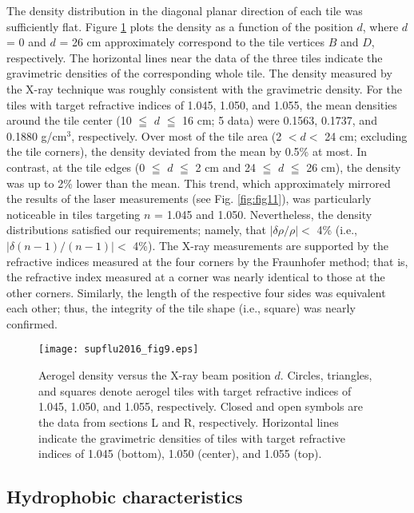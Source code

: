 \documentclass[5p,twocolumn]{elsarticle}
\begin{document}
The density distribution in the diagonal planar direction of each tile was sufficiently flat. Figure \ref{fig:fig9} plots the density as a function of the position $d$, where $d$ = 0 and $d$ = 26 cm approximately correspond to the tile vertices $B$ and $D$, respectively. The horizontal lines near the data of the three tiles indicate the gravimetric densities of the corresponding whole tile. The density measured by the X-ray technique was roughly consistent with the gravimetric density. For the tiles with target refractive indices of 1.045, 1.050, and 1.055, the mean densities around the tile center (10 $\leqq $ $d$ $\leqq $ 16 cm; 5 data) were 0.1563, 0.1737, and 0.1880 g/cm$^3$, respectively. Over most of the tile area (2 $< d <$ 24 cm; excluding the tile corners), the density deviated from the mean by 0.5\% at most. In contrast, at the tile edges (0 $\leqq $ $d$ $\leqq $ 2 cm and 24 $\leqq $ $d$ $\leqq $ 26 cm), the density was up to 2\% lower than the mean. This trend, which approximately mirrored the results of the laser measurements (see Fig. \ref{fig:fig11}), was particularly noticeable in tiles targeting $n$ = 1.045 and 1.050. Nevertheless, the density distributions satisfied our requirements; namely, that $|\delta \rho /\rho| <$ 4\% (i.e., $|\delta (n - 1)/(n - 1)| <$ 4\%). The X-ray measurements are supported by the refractive indices measured at the four corners by the Fraunhofer method; that is, the refractive index measured at a corner was nearly identical to those at the other corners. Similarly, the length of the respective four sides was equivalent each other; thus, the integrity of the tile shape (i.e., square) was nearly confirmed.

\begin{figure}[t]
\centering 
\texttt{[image: supflu2016\_fig9.eps]}
\caption{Aerogel density versus the X-ray beam position $d$. Circles, triangles, and squares denote aerogel tiles with target refractive indices of 1.045, 1.050, and 1.055, respectively. Closed and open symbols are the data from sections L and R, respectively. Horizontal lines indicate the gravimetric densities of tiles with target refractive indices of 1.045 (bottom), 1.050 (center), and 1.055 (top).}
\label{fig:fig9}
\end{figure}


\subsection{Hydrophobic characteristics}
\label{5-4}
\end{document}
